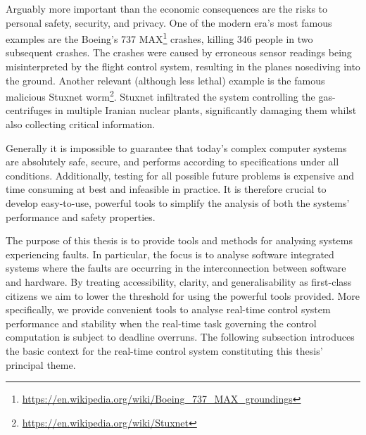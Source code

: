 Arguably more important than the economic consequences are the risks to personal safety, security, and privacy.
One of the modern era's most famous examples are the Boeing's 737 MAX\footnote{\url{https://en.wikipedia.org/wiki/Boeing_737_MAX_groundings}} crashes, killing 346 people in two subsequent crashes.
The crashes were caused by erroneous sensor readings being misinterpreted by the flight control system, resulting in the planes nosediving into the ground.
Another relevant (although less lethal) example is the famous malicious Stuxnet worm\footnote{\url{https://en.wikipedia.org/wiki/Stuxnet}}.
Stuxnet infiltrated the system controlling the gas-centrifuges in multiple Iranian nuclear plants, significantly damaging them whilst also collecting critical information. 

Generally it is impossible to guarantee that today's complex computer systems are absolutely safe, secure, and performs according to specifications under all conditions.
Additionally, testing for all possible future problems is expensive and time consuming at best and infeasible in practice.
It is therefore crucial to develop easy-to-use, powerful tools to simplify the analysis of both the systems' performance and safety properties.

The purpose of this thesis is to provide tools and methods for analysing systems experiencing faults.
In particular, the focus is to analyse software integrated systems where the faults are occurring in the interconnection between software and hardware.
By treating accessibility, clarity, and generalisability as first-class citizens we aim to lower the threshold for using the powerful tools provided. 
More specifically, we provide convenient tools to analyse real-time control system performance and stability when the real-time task governing the control computation is subject to deadline overruns.
The following subsection introduces the basic context for the real-time control system constituting this thesis' principal theme.


